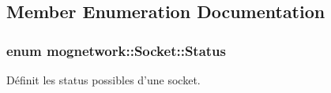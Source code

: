\subsection{Member Enumeration Documentation}
\hypertarget{classmognetwork_1_1_socket_aa187a8394ac0d6203af0ec7f021ca15f}{
\subsubsection[{Status}]{\setlength{\rightskip}{0pt plus 5cm}enum {\bf mognetwork\-::\-Socket\-::\-Status}}}\label{classmognetwork_1_1_socket_aa187a8394ac0d6203af0ec7f021ca15f}


Définit les status possibles d'une socket. 

